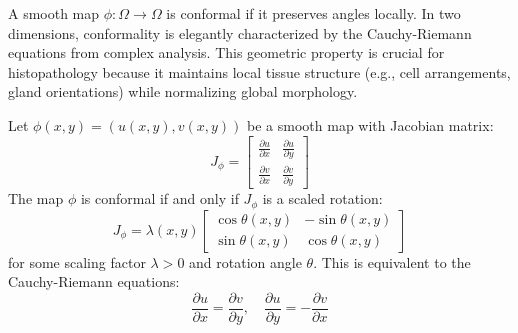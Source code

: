 A smooth map $\phi: \Omega \rightarrow \Omega$ is conformal if it preserves angles locally. In two dimensions, conformality is elegantly characterized by the Cauchy-Riemann equations from complex analysis. This geometric property is crucial for histopathology because it maintains local tissue structure (e.g., cell arrangements, gland orientations) while normalizing global morphology.

\begin{definition}
\label{def:conformal}
Let $\phi(x,y) = (u(x,y), v(x,y))$ be a smooth map with Jacobian matrix:
\begin{equation}
J_\phi = \begin{bmatrix} \frac{\partial u}{\partial x} & \frac{\partial u}{\partial y} \\ \frac{\partial v}{\partial x} & \frac{\partial v}{\partial y} \end{bmatrix}
\end{equation}
The map $\phi$ is conformal if and only if $J_\phi$ is a scaled rotation:
\begin{equation}
J_\phi = \lambda(x,y) \begin{bmatrix} \cos\theta(x,y) & -\sin\theta(x,y) \\ \sin\theta(x,y) & \cos\theta(x,y) \end{bmatrix}
\label{eq:conformal_jacobian}
\end{equation}
for some scaling factor $\lambda > 0$ and rotation angle $\theta$. This is equivalent to the Cauchy-Riemann equations:
\begin{equation}
\frac{\partial u}{\partial x} = \frac{\partial v}{\partial y}, \quad \frac{\partial u}{\partial y} = -\frac{\partial v}{\partial x}
\label{eq:cauchy_riemann}
\end{equation}
\end{definition}

